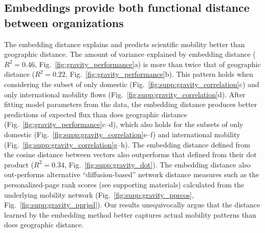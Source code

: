 \documentclass[12pt]{article} %
\begin{document}
%
%
%
\subsection*{Embeddings provide both functional distance between organizations}

The embedding distance explains and predicts scientific mobility better than geographic distance.
The amount of variance explained by embedding distance ($R^{2} = 0.46$, Fig.~\ref{fig:gravity_performance}a) is more than twice that of geographic distance ($R^{2} = 0.22$, Fig.~\ref{fig:gravity_performance}b).
This pattern holds when considering the subset of only domestic (Fig.~\ref{fig:supp:gravity_correlation}c) and only international mobility flows (Fig.~\ref{fig:supp:gravity_correlation}d).
After fitting model parameters from the data, the embedding distance produces better predictions of expected flux than does geographic distance (Fig.~\ref{fig:gravity_performance}c--d), which also holds for the subsets of only domestic (Fig.~\ref{fig:supp:gravity_correlation}e--f) and international mobility (Fig.~\ref{fig:supp:gravity_correlation}g--h).
The embedding distance defined from the cosine distance between vectors also outperforms that defined from their dot product ($R^{2} = 0.34$, Fig.~\ref{fig:supp:gravity_dot}).
The embedding distance also out-performs alternative ``diffusion-based'' network distance measures such as the personalized-page rank scores (see supporting materials) calculated from the underlying mobility network (Fig.~\ref{fig:supp:gravity_pprcos}, Fig.~\ref{fig:supp:gravity_pprjsd}).
Our results unequivocally argue that the distance learned by the embedding method better captures actual mobility patterns than does geographic distance. 
\end{document}
